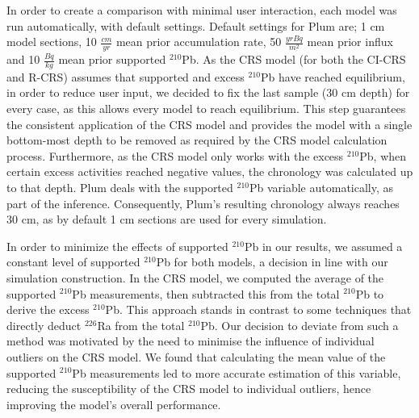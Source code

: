 \documentclass [10pt] {article}
\begin{document}
In order to create a comparison with minimal user interaction, each model was run automatically, with default settings.
Default settings for Plum are; 1 cm model sections, 10 $\frac{cm}{yr}$ mean prior accumulation rate, 50 $\frac{yr Bq}{m^2}$ mean prior influx and 10 $\frac{Bq}{kg}$ mean prior supported $^{210}$Pb.
As the CRS model (for both the CI-CRS and R-CRS) assumes that supported and excess $^{210}$Pb have reached equilibrium, in order to reduce user input, we decided to fix the last sample (30 cm depth) for every case, as this allows every model to reach equilibrium. This step guarantees the consistent application of the CRS model and provides the model with a single bottom-most depth to be removed as required by the CRS model calculation process. 
Furthermore, as the CRS model only works with the excess $^{210}$Pb, when certain excess activities reached negative values, the chronology was calculated up to that depth.
Plum deals with the supported $^{210}$Pb variable automatically, as part of the inference.
Consequently, Plum's resulting chronology always reaches 30 cm, as by default 1 cm sections are used for every simulation.

In order to minimize the effects of supported $^{210}$Pb in our results, we assumed a constant level of supported $^{210}$Pb for both models, a decision in line with our simulation construction. In the CRS model, we computed the average of the supported $^{210}$Pb measurements, then subtracted this from the total $^{210}$Pb to derive the excess $^{210}$Pb. This approach stands in contrast to some techniques that directly deduct $^{226}$Ra from the total $^{210}$Pb. Our decision to deviate from such a method was motivated by the need to minimise the influence of individual outliers on the CRS model. We found that calculating the mean value of the supported $^{210}$Pb measurements led to more accurate estimation of this variable, reducing the susceptibility of the CRS model to individual outliers, hence improving the model's overall performance.


\end{document}
